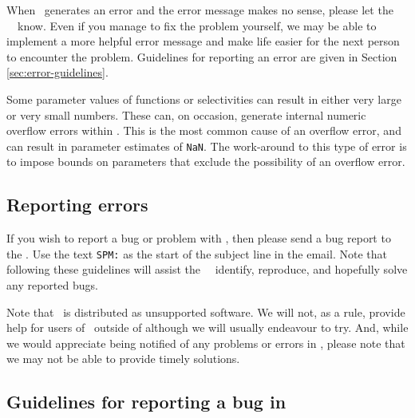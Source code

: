 When \SPM\ generates an error and the error message makes no sense, please let the \SPM\ \authors\ know. Even if you manage to fix the problem yourself, we may be able to implement a more helpful error message and make life easier for the next person to encounter the problem. Guidelines for reporting an error are given in Section \ref{sec:error-guidelines}.

Some parameter values of functions or selectivities can result in either very large or very small numbers. These can, on occasion, generate internal numeric overflow errors within \SPM. This is the most common cause of an overflow error, and can result in parameter estimates of \texttt{NaN}. The work-around to this type of error is to impose bounds on parameters that exclude the possibility of an overflow error.

\subsection{Reporting errors\label{sec:reporting-errors}}

If you wish to report a bug or problem with \SPM, then please send a bug report to the \authors. Use the text \texttt{SPM:} as the start of the subject line in the email. Note that following these guidelines will assist the \SPM\ \authors\ identify, reproduce, and hopefully solve any reported bugs. 

Note that \SPM\ is distributed as unsupported software. We will not, as a rule, provide help for users of \SPM\ outside of \href{http://www.niwa.co.nz}{\Organisation} \textemdash although we will usually endeavour to try. And, while we would appreciate being notified of any problems or errors in \SPM, please note that we may not be able to provide timely solutions.

\subsection{Guidelines for reporting a bug in \SPM\label{sec:error-guidelines}}

